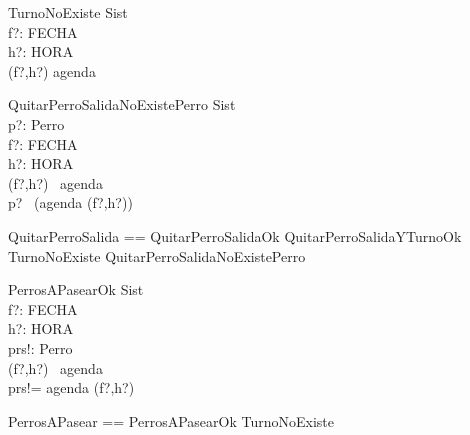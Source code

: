 \begin{schema}{TurnoNoExiste}
\Xi Sist \\
f?: FECHA \\
h?: HORA \\
\where
(f?,h?) \notin \dom agenda \\
\end{schema}

\begin{schema}{QuitarPerroSalidaNoExistePerro}
\Xi Sist \\
p?: Perro \\
f?: FECHA \\
h?: HORA \\
\where
(f?,h?) \in \dom \ agenda \\
p? \notin \ (agenda (f?,h?)) \\
\end{schema}

\begin{zed}
QuitarPerroSalida == QuitarPerroSalidaOk \lor QuitarPerroSalidaYTurnoOk \lor \\ TurnoNoExiste \lor QuitarPerroSalidaNoExistePerro
\end{zed}

\begin{schema}{PerrosAPasearOk}
\Xi Sist \\
f?: FECHA \\
h?: HORA \\
prs!: \power Perro\\
\where
(f?,h?) \in \dom \ agenda \\
prs!= agenda (f?,h?) \\
\end{schema}

\begin{zed}
PerrosAPasear == PerrosAPasearOk \lor TurnoNoExiste
\end{zed}
